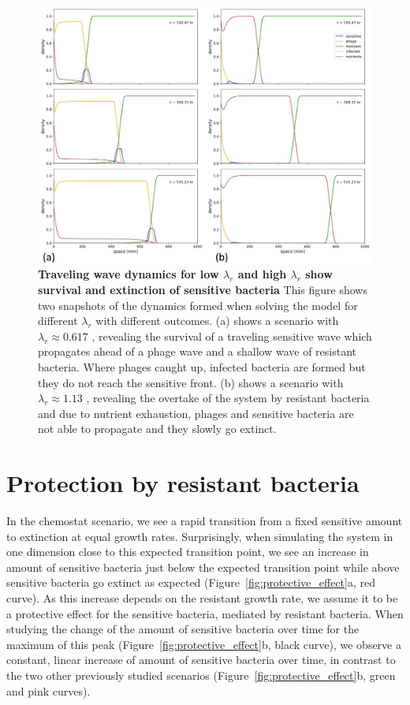 \begin{figure}
\centering
\includegraphics[width=\linewidth]{graphics/2025_09_30_phages_fig4.png}
\caption{\textbf{Traveling wave dynamics for low $\lambda_r$ and high $\lambda_r$ show survival and extinction of sensitive bacteria} This figure shows two snapshots of the dynamics formed when solving the model for different $\lambda_r$ with different outcomes. (a) shows a scenario with $\lambda_r \approx 0.617$ , revealing the survival of a traveling sensitive wave which propagates ahead of a phage wave and a shallow wave of resistant bacteria. Where phages caught up, infected bacteria are formed but they do not reach the sensitive front. (b) shows a scenario with $\lambda_r \approx 1.13$ , revealing the overtake of the system by resistant bacteria and due to nutrient exhaustion, phages and sensitive bacteria are not able to propagate and they slowly go extinct.}
\label{fig:traveling_wave_dynamics}
\end{figure}

\section{Protection by resistant bacteria}
\label{sec:protective_effect}
In the chemostat scenario, we see a rapid transition from a fixed sensitive amount to extinction at equal growth rates. Surprisingly, when simulating the system in one dimension close to this expected transition point, we see an increase in amount of sensitive bacteria just below the expected transition point while above sensitive bacteria go extinct as expected (Figure~\ref{fig:protective_effect}a, red curve). As this increase depends on the resistant growth rate, we assume it to be a protective effect for the sensitive bacteria, mediated by resistant bacteria. When studying the change of the amount of sensitive bacteria over time for the maximum of this peak (Figure~\ref{fig:protective_effect}b, black curve), we observe a constant, linear increase of amount of sensitive bacteria over time, in contrast to the two other previously studied scenarios (Figure~\ref{fig:protective_effect}b, green and pink curves).

